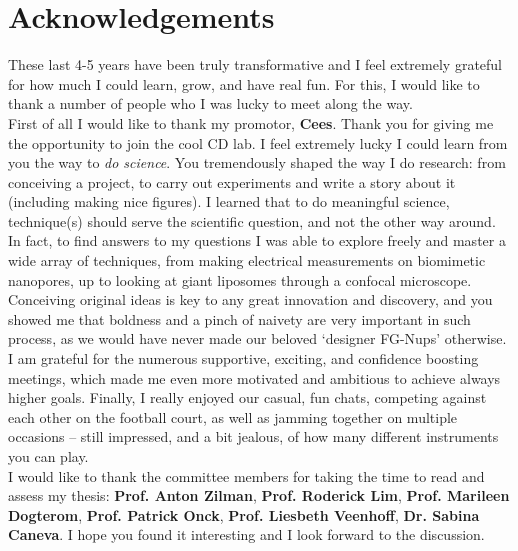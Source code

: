 \chapter*{Acknowledgements}
\label{acknowledgements}

These last 4-5 years have been truly transformative and I feel extremely grateful for how much I could learn, grow, and have real fun. For this, I would like to thank a number of people who I was lucky to meet along the way. \\[0.5pt]

\noindent First of all I would like to thank my promotor, \textbf{Cees}. Thank you for giving me the opportunity to join the cool CD lab. I feel extremely lucky I could learn from you the way to \emph{do science}. %
You tremendously shaped the way I do research: from conceiving a project, to carry out experiments and write a story about it (including making nice figures). I learned that to do meaningful science, technique(s) should serve the scientific question, and not the other way around. In fact, to find answers to my questions I was able to explore freely and master a wide array of techniques, from making electrical measurements on biomimetic nanopores, up to looking at giant liposomes through a confocal microscope. Conceiving original ideas is key to any great innovation and discovery, and you showed me that boldness and a pinch of naivety are very important in such process, as we would have never made our beloved `designer FG-Nups' otherwise. I am grateful for the numerous supportive, exciting, and confidence boosting meetings, which made me even more motivated and ambitious to achieve always higher goals. Finally, I really enjoyed our casual, fun chats, competing against each other on the football court, as well as jamming together on multiple occasions – still impressed, and a bit jealous, of how many different instruments you can play.\\[0.5pt]

\noindent I would like to thank the committee members for taking the time to read and assess my thesis: \textbf{Prof. Anton Zilman}, \textbf{Prof. Roderick Lim}, \textbf{Prof. Marileen Dogterom}, \textbf{Prof. Patrick Onck}, \textbf{Prof. Liesbeth Veenhoff}, \textbf{Dr. Sabina Caneva}. I hope you found it interesting and I look forward to the discussion.\\[0.5pt]

